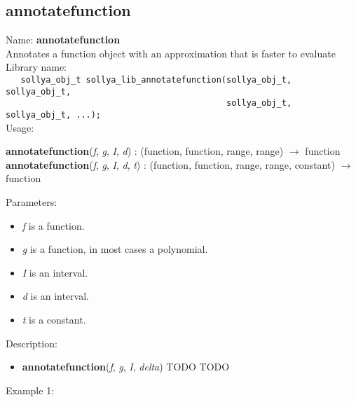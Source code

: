\subsection{annotatefunction}
\label{labannotatefunction}
\noindent Name: \textbf{annotatefunction}\\
\phantom{aaa}Annotates a \sollya function object with an approximation that is faster to evaluate\\[0.2cm]
\noindent Library name:\\
\verb|   sollya_obj_t sollya_lib_annotatefunction(sollya_obj_t, sollya_obj_t, |\\
\verb|                                            sollya_obj_t, sollya_obj_t, ...);|\\[0.2cm]
\noindent Usage: 
\begin{center}
\textbf{annotatefunction}(\emph{f}, \emph{g}, \emph{I}, \emph{d}) : (\textsf{function}, \textsf{function}, \textsf{range}, \textsf{range}) $\rightarrow$ \textsf{function}\\
\textbf{annotatefunction}(\emph{f}, \emph{g}, \emph{I}, \emph{d}, \emph{t}) : (\textsf{function}, \textsf{function}, \textsf{range}, \textsf{range}, \textsf{constant}) $\rightarrow$ \textsf{function}\\
\end{center}
Parameters: 
\begin{itemize}
\item \emph{f} is a function.
\item \emph{g} is a function, in most cases a polynomial.
\item \emph{I} is an interval.
\item \emph{d} is an interval.
\item \emph{t} is a constant.
\end{itemize}
\noindent Description: \begin{itemize}

\item \textbf{annotatefunction}(\emph{f}, \emph{g}, \emph{I}, \emph{delta}) TODO TODO
\end{itemize}
\noindent Example 1: 
